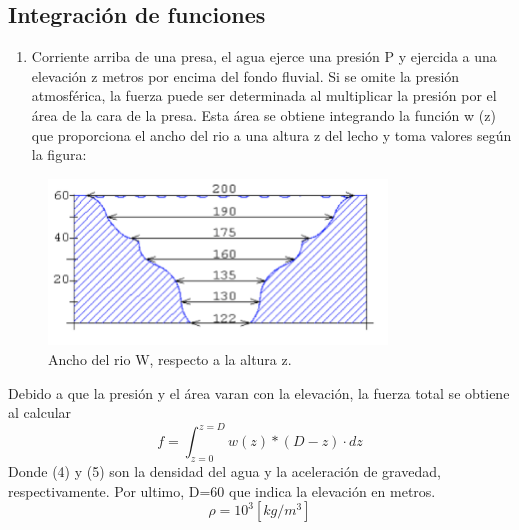 \documentclass{udpreport}
\begin{document}
\begin{enumerate}
\newpage


  
 \chapter{Integración de funciones} 

 
\begin{enumerate}
\item Corriente arriba de una presa, el agua ejerce una presión  P  y ejercida a una elevación z metros por encima del fondo fluvial. Si se omite la presión atmosférica, la fuerza puede ser determinada al multiplicar la presión por el  área de la cara de la presa. Esta área se obtiene integrando la función w (z) que proporciona el ancho del rio a una altura z del lecho y toma valores según la figura:
\end{enumerate}

 
 \begin{figure}[H]
    \centering
    \includegraphics[width=9cm]{enunciado2}
    \caption{Ancho del rio W, respecto a la altura z.} \label{fig:enunciado2}
\end{figure}
Debido a que la presión y el área varan con la elevación, la fuerza total se obtiene al calcular
 \begin{equation}
 f=\int_{z=0}^{z=D} w(z)*(D-z) \cdot dz
\end{equation}
Donde (4) y (5) son la densidad del agua y la aceleración de gravedad, respectivamente. Por ultimo, D=60 que indica la elevación en metros.
\begin{equation}
 \rho=10^3[kg/m^3] 
\end{equation}
 

\end{enumerate}
\end{document}
